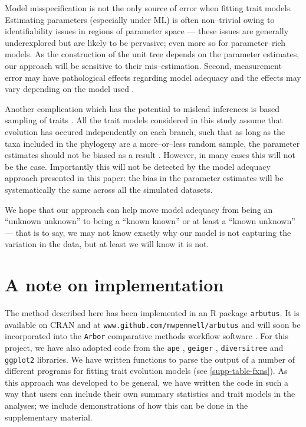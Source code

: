 \documentclass[12pt]{article}
\begin{document}
Model misspecification is not the only source of error when fitting trait models. Estimating parameters (especially under ML) is often non--trivial owing to identifiability issues in regions of parameter space \citep{HoAne2008, HoAne2012} --- these issues are generally underexplored but are likely to be pervasive; even more so for parameter--rich models. As the construction of the unit tree depends on the parameter estimates, our approach will be sensitive to their mis--estimation. Second, measurement error may have pathological effects regarding model adequacy \citep{HarmonLosos2005} and the effects may vary depending on the model used \citep{RevellReynolds2012, PennellPE}.


Another complication which has the potential to mislead inferences is based sampling of traits \citep{Freckletoninaction, longeuroname, FitzJohnwoody}. All the trait models considered in this study assume that evolution has occured independently on each branch, such that as long as the taxa included in the phylogeny are a more--or--less random sample, the parameter estimates should not be biased as a result \citep{PennellHarmon}. However, in many cases \citep[especially when using large trait databases][]{FitzJohnwoody} this will not be the case. Importantly this will not be detected by the model adequacy approach presented in this paper: the bias in the parameter estimates will be systematically the same across all the simulated datasets.

We hope that our approach can help move model adequacy from being an ``unknown unknown''  to being a ``known known'' or at least a ``known unknown'' --- that is to say, we may not know exactly why our model is not capturing the variation in the data, but at least we will know it is not.


\section*{A note on implementation}

The method described here has been implemented in an R package \texttt{arbutus}. It is available on CRAN and at \texttt{www.github.com/mwpennell/arbutus} and will soon be incorporated into the \texttt{Arbor} comparative methods workflow software \citep{Arbor}. For this project, we have also adopted code from the \texttt{ape} \citep{ape}, \texttt{geiger} \citep{geiger}, \texttt{diversitree} \citep{FitzJohn2012} and \texttt{ggplot2} \citep{ggplot2} libraries. We have written functions to parse the output of a number of different programs for fitting trait evolution models (see \ref{supp-table-fxns}). As this approach was developed to be general, we have written the code in such a way that users can include their own summary statistics and trait models in the analyses; we include demonstrations of how this can be done in the supplementary material.
\end{document}
